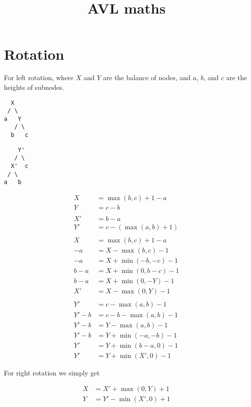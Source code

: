 \documentclass{article}
\title{AVL maths}
\author{}
\date{}
\begin{document}
\maketitle

\section{Rotation}

For left rotation, where $X$ and $Y$ are the balance of nodes, and $a$, $b$, and
$c$ are the heights of subnodes.

\begin{verbatim}
  X
 / \
a   Y
   / \
  b   c
\end{verbatim}

\begin{verbatim}
    Y'
   / \
  X'  c
 / \
a   b
\end{verbatim}

\begin{align*}
    X &= \max(b,c) + 1 - a\\
    Y &= c - b\\
    \\
    X' &= b - a\\
    Y' &= c - (\max(a,b) + 1)\\
    \\
    X &= \max(b,c) + 1 - a\\
    -a &= X - \max(b,c) - 1\\
    -a &= X + \min(-b,-c) - 1\\
    b - a &= X + \min(0,b-c) - 1\\
    b - a &= X + \min(0,-Y) - 1\\
    X' &= X - \max(0,Y) - 1\\
    \\
    Y' &= c - \max(a,b) - 1\\
    Y' - b &= c - b - \max(a,b) - 1\\
    Y' - b &= Y - \max(a,b) - 1\\
    Y' - b &= Y + \min(-a,-b) - 1\\
    Y' &= Y + \min(b-a,0) - 1\\
    Y' &= Y + \min(X',0) - 1
\end{align*}

For right rotation we simply get

\begin{align*}
    X &= X' + \max(0,Y) + 1\\
    Y &= Y' - \min(X',0) + 1
\end{align*}
\end{document}

